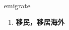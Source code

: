 
\begin{frame}
{\huge emigrate}
\begin{center}
\begin{enumerate}\Large
  \item \textbf{移民，移居海外}
\end{enumerate}
\end{center}
\end{frame}
